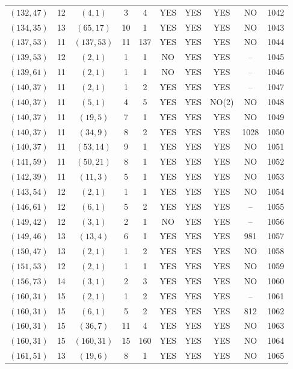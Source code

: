 \begin{longtable}{|c|c|c|c|c|c|c|c|c|c|}
$(132, 47)$ & 12 & $(4, 1)$ & 3 & 4 & YES & YES & YES & NO & 1042\\
$(134, 35)$ & 13 & $(65, 17)$ & 10 & 1 & YES & YES & YES & NO & 1043\\
$(137, 53)$ & 11 & $(137, 53)$ & 11 & 137 & YES & YES & YES & NO & 1044\\
$(139, 53)$ & 12 & $(2, 1)$ & 1 & 1 & NO & YES & YES & -- & 1045\\
$(139, 61)$ & 11 & $(2, 1)$ & 1 & 1 & NO & YES & YES & -- & 1046\\
$(140, 37)$ & 11 & $(2, 1)$ & 1 & 2 & YES & YES & YES & -- & 1047\\
$(140, 37)$ & 11 & $(5, 1)$ & 4 & 5 & YES & YES & NO(2) & NO & 1048\\
$(140, 37)$ & 11 & $(19, 5)$ & 7 & 1 & YES & YES & YES & NO & 1049\\
$(140, 37)$ & 11 & $(34, 9)$ & 8 & 2 & YES & YES & YES & 1028 & 1050\\
$(140, 37)$ & 11 & $(53, 14)$ & 9 & 1 & YES & YES & YES & NO & 1051\\
$(141, 59)$ & 11 & $(50, 21)$ & 8 & 1 & YES & YES & YES & NO & 1052\\
$(142, 39)$ & 11 & $(11, 3)$ & 5 & 1 & YES & YES & YES & NO & 1053\\
$(143, 54)$ & 12 & $(2, 1)$ & 1 & 1 & YES & YES & YES & NO & 1054\\
$(146, 61)$ & 12 & $(6, 1)$ & 5 & 2 & YES & YES & YES & -- & 1055\\
$(149, 42)$ & 12 & $(3, 1)$ & 2 & 1 & NO & YES & YES & -- & 1056\\
$(149, 46)$ & 13 & $(13, 4)$ & 6 & 1 & YES & YES & YES & 981 & 1057\\
$(150, 47)$ & 13 & $(2, 1)$ & 1 & 2 & YES & YES & YES & NO & 1058\\
$(151, 53)$ & 12 & $(2, 1)$ & 1 & 1 & YES & YES & YES & NO & 1059\\
$(156, 73)$ & 14 & $(3, 1)$ & 2 & 3 & YES & YES & YES & NO & 1060\\
$(160, 31)$ & 15 & $(2, 1)$ & 1 & 2 & YES & YES & YES & -- & 1061\\
$(160, 31)$ & 15 & $(6, 1)$ & 5 & 2 & YES & YES & YES & 812 & 1062\\
$(160, 31)$ & 15 & $(36, 7)$ & 11 & 4 & YES & YES & YES & NO & 1063\\
$(160, 31)$ & 15 & $(160, 31)$ & 15 & 160 & YES & YES & YES & NO & 1064\\
$(161, 51)$ & 13 & $(19, 6)$ & 8 & 1 & YES & YES & YES & NO & 1065\\

\end{longtable}
